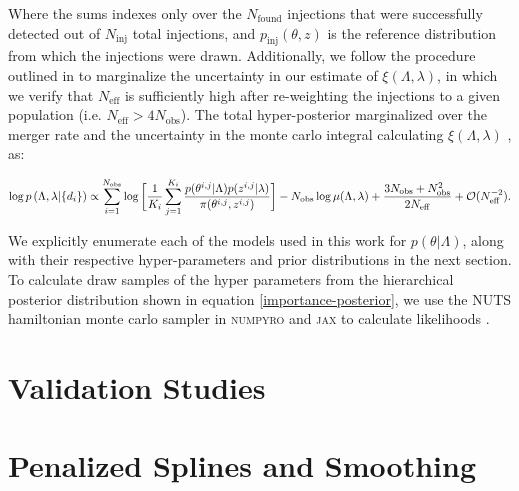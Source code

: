 \noindent
Where the sums indexes only over the $N_\mathrm{found}$ injections that were successfully detected out of $N_\mathrm{inj}$ total injections, 
and $p_\mathrm{inj}(\theta, z)$ is the reference distribution from which the injections were drawn. Additionally, we follow the procedure 
outlined in \citet{Farr_2019} to marginalize the uncertainty in our estimate of $\xi(\Lambda, \lambda)$, in which we verify that $N_\mathrm{eff}$ is 
sufficiently high after re-weighting the injections to a given population (i.e. $N_\mathrm{eff} > 4N_\mathrm{obs}$). 
The total hyper-posterior marginalized over the merger rate and the uncertainty in the monte carlo integral calculating $\xi(\Lambda, \lambda)$ \citep{Farr_2019}, as:

\begin{equation}\label{importance-posterior}
    \log p\left(\Lambda, \lambda | \{d_i\}\right) \propto \sum_{i=1}^{N_\mathrm{obs}} \log \bigg[ \frac{1}{K_i} \sum_{j=1}^{K_i} \frac{p(\theta^{i,j}|\Lambda)p(z^{i,j}|\lambda)}{\pi(\theta^{i,j}, z^{i,j})} \bigg] -  \\
    N_\mathrm{obs} \log \mu(\Lambda, \lambda) + \frac{3N_\mathrm{obs} + N_\mathrm{obs}^2}{2N_\mathrm{eff}} + \mathcal{O}(N_\mathrm{eff}^{-2}).
\end{equation}

We explicitly enumerate each of the models used in this work for $p(\theta|\Lambda)$, along with 
their respective hyper-parameters and prior distributions in the next section. To calculate draw 
samples of the hyper parameters from the hierarchical posterior distribution shown in equation \ref{importance-posterior}, we use the 
NUTS hamiltonian monte carlo sampler in \textsc{numpyro} and \textsc{jax} to calculate likelihoods .


\section{Validation Studies} \label{sec:validation}

\section{Penalized Splines and Smoothing}\label{sec:psplines}

